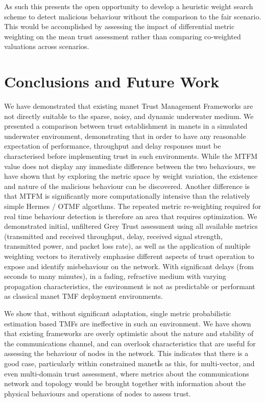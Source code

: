 As such this presents the open opportunity to develop a heuristic weight search scheme to detect malicious behaviour without the comparison to the fair scenario.
This would be accomplished by assessing the impact of differential metric weighting on the mean trust assessment rather than comparing co-weighted valuations across scenarios.


\section{Conclusions and Future Work}
We have demonstrated that existing \gls{manet} Trust Management Frameworks are not directly suitable to the sparse, noisy, and dynamic underwater medium.
We presented a comparison between trust establishment in \gls{manet}s in a simulated underwater environment, demonstrating that in order to have any reasonable expectation of performance, throughput and delay responses must be characterised before implementing trust in such environments. 
While the MTFM value does not display any immediate difference between the two behaviours, we have shown that by exploring the metric space by weight variation, the existence and nature of the malicious behaviour can be discovered.
Another difference is that MTFM is significantly more computationally intensive than the relatively simple Hermes / OTMF algorthms.
The repeated metric re-weighting required for real time behaviour detection is therefore an area that requires optimization.
We demonstrated initial, unfiltered Grey Trust assessment using all available metrics (transmitted and received throughput, delay, received signal strength, transmitted power, and packet loss rate), as well as the application of multiple weighting vectors to iteratively emphasise different aspects of trust operation to expose and identify misbehaviour on the network.
With significant delays (from seconds to many minutes), in a fading, refractive medium with varying propagation characteristics, the environment is not as predictable or performant as classical \gls{manet} TMF deployment environments.

We show that, without significant adaptation, single metric probabilistic estimation based TMFs are ineffective in such an environment.
We have shown that existing frameworks are overly optimistic about the nature and stability of the communications channel, and can overlook characteristics that are useful for assessing the behaviour of nodes in the network. 
This indicates that there is a good case, particularly within constrained \gls{manet}Ìs as this, for multi-vector, and even multi-domain trust assessment, where metrics about the communications network and topology would be brought together with information about the physical behaviours and operations of nodes to assess trust.

